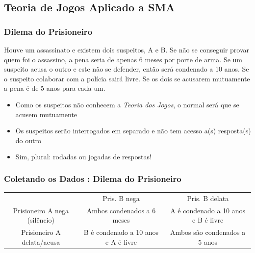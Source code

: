 \subsection{Teoria de Jogos Aplicado a SMA}
\begin{frame}

    \frametitle{Dilema do Prisioneiro}
    \begin{block}
    Houve um assassinato e existem dois suspeitos, A e B. Se não se conseguir provar quem foi o assassino, a 
pena seria de apenas 6 meses por porte de arma.
Se um suspeito acusa o outro e este não se defender, então  será condenado a 10 anos.
Se o suspeito colaborar com a polícia sairá livre.
Se os dois se acusarem mutuamente a pena é de 5 anos para cada um.

\begin{itemize}
  
  \item Como os suspeitos não conhecem a \textit{Teoria dos Jogos}, o normal será que se acusem mutuamente
    
  \item Os suspeitos serão interrogados em separado e não tem acesso a(s) resposta(s) do outro

\item Sim, plural: rodadas ou jogadas de respostas!
\end{itemize}

    \end{block}
 
\end{frame}


\begin{frame}

    \frametitle{Coletando os Dados : Dilema do Prisioneiro}
    
    
      \begin{center}
        \begin{tabular}{ccc} \hline \hline
             & Pris. B nega &  Pris. B delata   \\
        Prisioneiro A nega (silêncio)  &  Ambos condenados a 6 meses  & A é condenado a 10 anos e B é livre   \\ \hline \hline
         Prisioneiro A delata/acusa     & B é condenado a 10 anos e A é livre & Ambos são condenados a 5 anos \\ \hline 
         \hline \hline
        \end{tabular}
      \end{center}

\end{frame}


